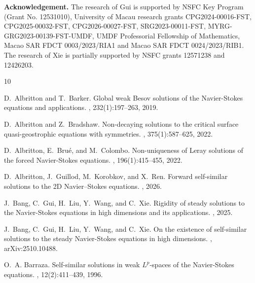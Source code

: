 \documentclass[12pt]{amsart}
\numberwithin{equation}{section}              %
\theoremstyle{remark}
\begin{document}
			
		
		{\bf Acknowledgement.}
		The research of Gui is supported by  NSFC Key Program (Grant No. 12531010),  University of Macau research grants CPG2024-00016-FST, CPG2025-00032-FST, CPG2026-00027-FST, SRG2023-00011-FST, MYRG-GRG2023-00139-FST-UMDF, UMDF Professorial Fellowship of Mathematics, Macao SAR FDCT 0003/2023/RIA1 and  Macao SAR FDCT 0024/2023/RIB1.   The research of  Xie is partially supported by  NSFC grants 12571238 and 12426203.

      \begin{thebibliography}{10}
      	
      	D.~Albritton and T.~Barker.
      	\newblock Global weak {B}esov solutions of the {N}avier-{S}tokes equations and
      	applications.
      	, 232(1):197--263, 2019.
      	
      	D.~Albritton and Z.~Bradshaw.
      	\newblock Non-decaying solutions to the critical surface quasi-geostrophic
      	equations with symmetries.
      	, 375(1):587--625, 2022.
      	
      	D.~Albritton, E.~Bru\'e, and M.~Colombo.
      	\newblock Non-uniqueness of {L}eray solutions of the forced {N}avier-{S}tokes
      	equations.
      	, 196(1):415--455, 2022.
      	
      	D.~Albritton, J.~Guillod, M.~Korobkov, and X.~Ren.
      	\newblock Forward self-similar solutions to the 2{D} {N}avier--{S}tokes
      	equations.
      	, 2026.
      	
      	J.~Bang, C.~Gui, H.~Liu, Y.~Wang, and C.~Xie.
      	\newblock Rigidity of steady solutions to the {N}avier-{S}tokes equations in
      	high dimensions and its applications.
      	, 2025.
      	
      	J.~Bang, C.~Gui, H.~Liu, Y.~Wang, and C.~Xie.
      	\newblock On the existence of self-similar solutions to the steady
      	{N}avier-{S}tokes equations in high dimensions.
      	, arXiv:2510.10488.
      	
      	O.~A. Barraza.
      	\newblock Self-similar solutions in weak {$L^p$}-spaces of the
      	{N}avier-{S}tokes equations.
      	, 12(2):411--439, 1996.
      	

\end{thebibliography}
\end{document}

